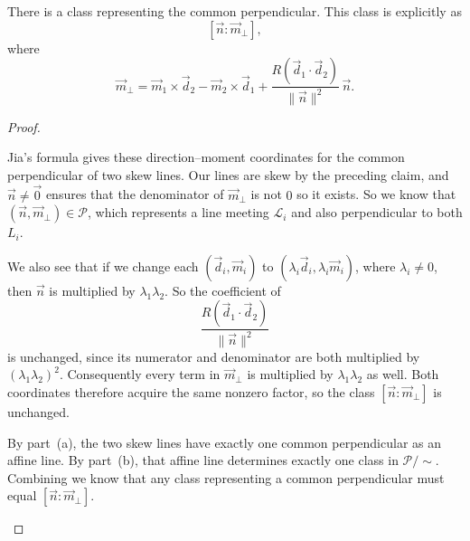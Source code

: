 \documentclass[11pt]{scrartcl}
\begin{document}
\begin{soln}
    \begin{claim*}
        There is a class representing the common perpendicular. This class 
		is explicitly as 
        \[
        \boxed{[\vec n:\vec m_\perp]},
        \]
        where
        \[
        \vec m_\perp
        =\vec m_1\times\vec d_2-\vec m_2\times\vec d_1
        +\frac{R(\vec d_1\cdot\vec d_2)}{\|\vec n\|^2}\,\vec n.
        \]
    \end{claim*}

    \begin{proof}
        \begin{subproof}[Existence]
            Jia's formula \cite[Theorem~4, equations~(17)--(18)]{jia-plucker}
            gives these direction--moment coordinates for the common
            perpendicular of two skew lines.
            Our lines are skew by the preceding claim, and
            $\vec n\neq\vec0$ ensures that the denominator of $\vec m_\perp$ is
			not $0$ so it exists.
            So we know that $(\vec n,\vec m_\perp)\in\mathcal P$,
            which represents a line meeting $\mathcal L_i$ and also perpendicular
			to both $L_i$.
        \end{subproof}

        \begin{subproof}
            We also see that if we change each
    $(\vec d_i,\vec m_i)$ to
$(\lambda_i\vec d_i,\lambda_i\vec m_i)$,
where $\lambda_i\neq0$, then $\vec n$ is
multiplied by $\lambda_1\lambda_2$.
            So the coefficient of 
            \[
            \frac{R(\vec d_1\cdot\vec d_2)}{\|\vec n\|^2}
            \]
            is unchanged, since its numerator and denominator are both
            multiplied by $(\lambda_1\lambda_2)^2$.
            Consequently every term in $\vec m_\perp$ is multiplied by
            $\lambda_1\lambda_2$ as well.
            Both coordinates therefore acquire the same nonzero factor,
            so the class $[\vec n:\vec m_\perp]$ is unchanged.
        \end{subproof}

        \begin{subproof}[Unique?]
            By part~(a), the two skew lines have exactly one common
            perpendicular as an affine line.
            By part~(b), that affine line determines exactly one class
            in $\mathcal P/\sim$.
            Combining we know that any class representing a common perpendicular must
            equal $[\vec n:\vec m_\perp]$.
        \end{subproof}
    \end{proof}
\end{soln}
\end{document}
